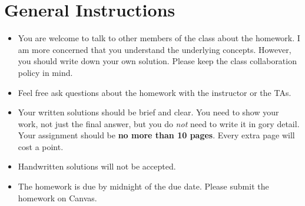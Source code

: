 \section*{General Instructions}

{\footnotesize
  \begin{itemize}
  \item You are welcome to talk to other members of the class about
    the homework. I am more concerned that you understand the
    underlying concepts. However, you should write down your own
    solution. Please keep the class collaboration policy in mind.

  \item Feel free ask questions about the homework with the instructor
    or the TAs.

  \item Your written solutions should be brief and clear. You need to
    show your work, not just the final answer, but you do \emph{not}
    need to write it in gory detail. Your assignment should be {\bf no
      more than 10 pages}. Every extra page will cost a point.

  \item Handwritten solutions will not be accepted.

  \item The homework is due by midnight of the due date. Please submit
    the homework on Canvas.

  \end{itemize}
}

